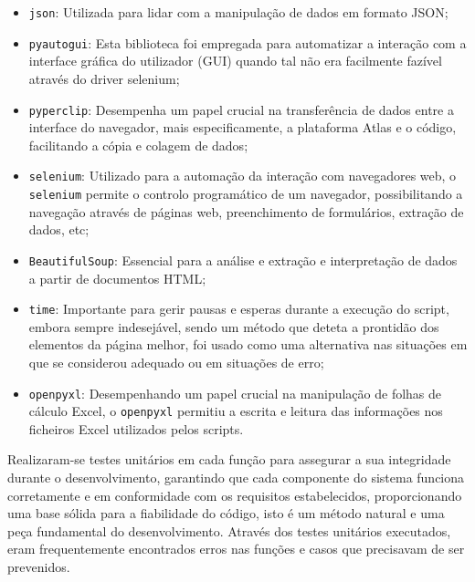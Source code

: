                 \begin{itemize}
                    \item \texttt{json}: Utilizada para lidar com a manipulação de dados em formato JSON;

                    \item \texttt{pyautogui}: Esta biblioteca foi empregada para automatizar a interação com a interface gráfica do utilizador (GUI) quando tal não era facilmente fazível através do driver selenium;
                    
                    \item \texttt{pyperclip}: Desempenha um papel crucial na transferência de dados entre a interface do navegador, mais especificamente, a plataforma Atlas e o código, facilitando a cópia e colagem de dados;
                    
                    \item \texttt{selenium}: Utilizado para a automação da interação com navegadores web, o \texttt{selenium} permite o controlo programático de um navegador, possibilitando a navegação através de páginas web, preenchimento de formulários,  extração de dados, etc;
                    
                    \item \texttt{BeautifulSoup}: Essencial para a análise e extração e interpretação de dados a partir de documentos HTML;
                    
                    \item \texttt{time}: Importante para gerir pausas e esperas durante a execução do script, embora sempre indesejável, sendo um método que deteta a prontidão dos elementos da página melhor, foi usado como uma alternativa nas situações em que se considerou adequado ou em situações de erro;
                    
                    \item \texttt{openpyxl}: Desempenhando um papel crucial na manipulação de folhas de cálculo Excel, o \texttt{openpyxl} permitiu a escrita e leitura das informações nos ficheiros Excel utilizados pelos scripts.
                \end{itemize}

            \label{secsecsec:testes_validacoes_python}

                Realizaram-se testes unitários em cada função para assegurar a sua integridade durante o desenvolvimento, garantindo que cada componente do sistema funciona corretamente e em conformidade com os requisitos estabelecidos, proporcionando uma base sólida para a fiabilidade do código, isto é um método natural e uma peça fundamental do desenvolvimento. Através dos testes unitários executados, eram frequentemente encontrados erros nas funções e casos que precisavam de ser prevenidos.
            
